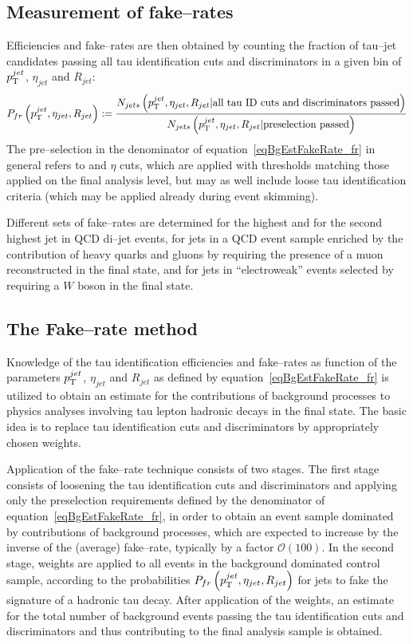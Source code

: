 \subsection{Measurement of fake--rates}

Efficiencies and fake--rates are then obtained by counting the fraction of tau--jet candidates
passing all tau identification cuts and discriminators
in a given bin of $p_{\mathrm{T}}^{jet}$, $\eta_{jet}$ and $R_{jet}$:
\begin{equation}
P_{fr} \left( p_{\mathrm{T}}^{jet}, \eta_{jet}, R_{jet} \right) := 
  \frac{N_{jets} \left( p_{\mathrm{T}}^{jet}, \eta_{jet}, R_{jet} \vert \mbox{all tau ID cuts and discriminators passed} \right)}
       {N_{jets} \left( p_{\mathrm{T}}^{jet}, \eta_{jet}, R_{jet} \vert \mbox{preselection passed} \right)}
\label{eqBgEstFakeRate_fr}
\end{equation}
The pre--selection in the denominator of equation~\ref{eqBgEstFakeRate_fr} in
general refers to \pt and $\eta$ cuts, which are applied with thresholds
matching those applied on the final analysis level, but may as well include
loose tau identification criteria (which may be applied \eg already during event
skimming).

Different sets of fake--rates are determined for the highest \pt and for the
second highest \pt jet in QCD di--jet events, for jets in a QCD event sample
enriched by the contribution of heavy quarks and gluons by requiring the
presence of a muon reconstructed in the final state, and for jets in
``electroweak'' events selected by requiring a $W$ boson in the final state.

\subsection{The Fake--rate method}

Knowledge of the tau identification efficiencies and fake--rates as function of
the parameters $p_{\mathrm{T}}^{jet}$, $\eta_{jet}$ and $R_{jet}$ as defined by
equation~\ref{eqBgEstFakeRate_fr} is utilized to obtain an estimate for the
contributions of background processes to physics analyses involving tau lepton
hadronic decays in the final state.  The basic idea is to replace tau
identification cuts and discriminators by appropriately chosen weights.

Application of the fake--rate technique consists of two stages.  The first stage
consists of loosening the tau identification cuts and discriminators and
applying only the preselection requirements defined by the denominator of
equation~\ref{eqBgEstFakeRate_fr}, in order to obtain an event sample dominated
by contributions of background processes, which are expected to increase by the
inverse of the (average) fake--rate, typically by a factor $\mathcal{O} \left(
100 \right)$.  In the second stage, weights are applied to all events in the
background dominated control sample, according to the probabilities $P_{fr}
\left( p_{\mathrm{T}}^{jet}, \eta_{jet}, R_{jet} \right)$ for jets to fake the signature
of a hadronic tau decay.  After application of the weights, an estimate for the
total number of background events passing the tau identification cuts and
discriminators and thus contributing to the final analysis sample is obtained.

